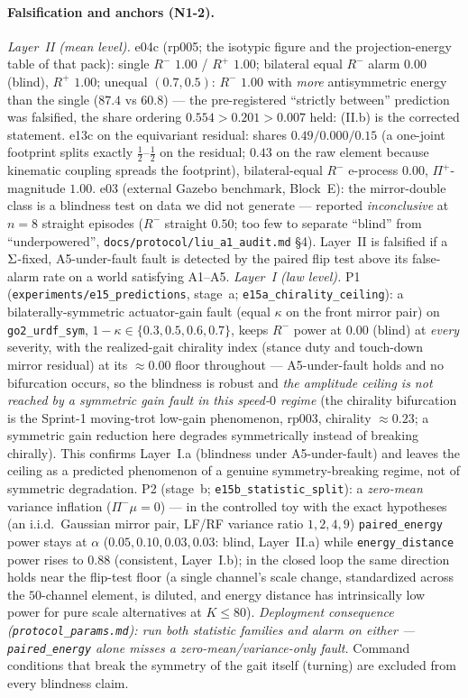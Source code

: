 \paragraph{Falsification and anchors (N1-2).}
\emph{Layer~II (mean level).} e04c (rp005; the isotypic figure and the
projection-energy table of that pack): single $R^-$ $1.00$ / $R^+$ $1.00$;
bilateral equal $R^-$ alarm $0.00$ (blind), $R^+$ $1.00$; unequal $(0.7, 0.5)$:
$R^-$ $1.00$ with \emph{more} antisymmetric energy than the single ($87.4$ vs
$60.8$) --- the pre-registered ``strictly between'' prediction was falsified,
the share ordering $0.554 > 0.201 > 0.007$ held: (II.b) is the corrected
statement. e13c on the equivariant residual: shares $0.49 / 0.000 / 0.15$ (a
one-joint footprint splits exactly $\tfrac12$--$\tfrac12$ on the residual;
$0.43$ on the raw element because kinematic coupling spreads the footprint),
bilateral-equal $R^-$ e-process $0.00$, $\Pi^+$-magnitude $1.00$. e03
(external Gazebo benchmark, Block~E): the mirror-double class is a blindness
test on data we did not generate --- reported \emph{inconclusive} at $n = 8$
straight episodes ($R^-$ straight $0.50$; too few to separate ``blind'' from
``underpowered'', \texttt{docs/protocol/liu\_a1\_audit.md} \S4). Layer~II is
falsified if a $\Sigma$-fixed, A5-under-fault fault is detected by the
paired flip test above its false-alarm rate on a world satisfying A1--A5.
\emph{Layer~I (law level).} P1 (\texttt{experiments/e15\_predictions}, stage~a;
\texttt{e15a\_chirality\_ceiling}): a bilaterally-symmetric actuator-gain fault
(equal $\kappa$ on the front mirror pair) on \texttt{go2\_urdf\_sym},
$1-\kappa \in \{0.3,0.5,0.6,0.7\}$, keeps $R^-$ power at $0.00$ (blind) at
\emph{every} severity, with the realized-gait chirality index (stance duty
and touch-down mirror residual) at its $\approx 0.00$ floor throughout ---
A5-under-fault holds and no bifurcation occurs, so the blindness is robust and
\emph{the amplitude ceiling is not reached by a symmetric gain fault in this
speed-$0$ regime} (the chirality bifurcation is the Sprint-1 moving-trot
low-gain phenomenon, rp003, chirality $\approx 0.23$; a symmetric gain
reduction here degrades symmetrically instead of breaking chirally). This
confirms Layer~I.a (blindness under A5-under-fault) and leaves the ceiling as
a predicted phenomenon of a genuine symmetry-breaking regime, not of symmetric
degradation. P2 (stage~b; \texttt{e15b\_statistic\_split}): a \emph{zero-mean}
variance inflation ($\Pi^-\mu = 0$) --- in the controlled toy with the exact
hypotheses (an i.i.d.\ Gaussian mirror pair, LF/RF variance ratio $1,2,4,9$)
\texttt{paired\_energy} power stays at $\alpha$ ($0.05,0.10,0.03,0.03$: blind,
Layer~II.a) while \texttt{energy\_distance} power rises to $0.88$ (consistent,
Layer~I.b); in the closed loop the same direction holds near the flip-test
floor (a single channel's scale change, standardized across the $50$-channel
element, is diluted, and energy distance has intrinsically low power for pure
scale alternatives at $K \le 80$). \emph{Deployment consequence
(\texttt{protocol\_params.md}): run both statistic families and alarm on
either --- \texttt{paired\_energy} alone misses a zero-mean/variance-only
fault.} Command conditions that break the symmetry of the gait itself
(turning) are excluded from every blindness claim.

